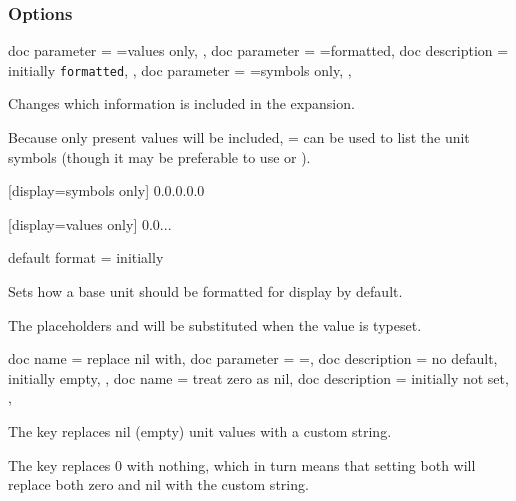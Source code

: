 \documentclass[
	a4paper,
]{article}
\begin{document}
\clearpage
\subsubsection{Options}
	
\begin{docKeys}[
		doc name = display,
	]{
		{
			doc parameter = {=values only},
		},
		{
			doc parameter = {=formatted},
			doc description = initially \texttt{formatted},
		},
		{
			doc parameter = {=symbols only},
		},
	}

	Changes which information is included in the expansion.

	Because only present values will be included, = can be used to list the unit symbols (though it may be preferable to use  or ).

\begin{dispExample}
	[display=symbols only]
	{0.0.0.0.0}

	[display=values only]
	{0.0...}
\end{dispExample}
	
\end{docKeys}

\begin{docKey}
	{default format}
	{=}
	{initially }

	Sets how a base unit should be formatted for display by default.
	
	The placeholders  and  will be substituted when the value is typeset.
\end{docKey}

\begin{docKeys}
	[]
	{
		{
			doc name = replace nil with,
			doc parameter = {=},
			doc description = {no default, initially empty},
		},
		{
			doc name = treat zero as nil,
			doc description = {initially not set},
		},
	}

The key  replaces nil (empty) unit values with a custom string.

The key  replaces 0 with nothing, which in turn means that setting both will replace both zero and nil with the custom string.

\end{docKeys}
\end{document}
